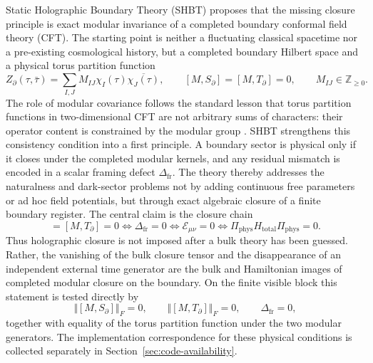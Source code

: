 \documentclass[11pt,letterpaper]{article}
\theoremstyle{plain}
\newcommand{\Deltafr}{\Delta_{\text{fr}}}
\newcommand{\Ebulk}{\mathcal E_{\mu\nu}}
\newcommand{\Zboundary}{Z_{\partial}}
\newcommand{\Htotal}{H_{\text{total}}}
\begin{document}
Static Holographic Boundary Theory (SHBT) proposes that the missing closure
principle is exact modular invariance of a completed boundary conformal field
theory (CFT).  The starting point is neither a fluctuating classical spacetime
nor a pre-existing cosmological history, but a completed boundary Hilbert space
and a physical torus partition function
\begin{equation}
 \Zboundary(\tau,\bar\tau)
 =
 \sum_{I,J}M_{IJ}\chi_I(\tau)\overline{\chi_J(\tau)},
 \qquad
 [M,S_{\partial}]=[M,T_{\partial}]=0,
 \qquad
 M_{IJ}\in\mathbb Z_{\ge0}.
\end{equation}
The role of modular covariance follows the standard lesson that torus partition
functions in two-dimensional CFT are not arbitrary sums of characters: their
operator content is constrained by the modular group
\cite{cardy1986,cappelli1987}.  SHBT strengthens this consistency condition
into a first principle.  A boundary sector is physical only if it closes under
the completed modular kernels, and any residual mismatch is encoded in a scalar
framing defect $\Deltafr$.  The theory thereby addresses the naturalness and
dark-sector problems not by adding continuous free parameters or ad hoc field
potentials, but through exact algebraic closure of a finite boundary register.  The central claim is the closure chain
\begin{equation}
 [M,S_{\partial}]=[M,T_{\partial}]=0
 \Longleftrightarrow
 \Deltafr=0
 \Longleftrightarrow
 \Ebulk=0
 \Longleftrightarrow
 \Pi_{\text{phys}}\Htotal\Pi_{\text{phys}}=0.
\end{equation}
Thus holographic closure is not imposed after a bulk theory has been guessed.
Rather, the vanishing of the bulk closure tensor and the disappearance of an
independent external time generator are the bulk and Hamiltonian images of
completed modular closure on the boundary.  On the finite visible block this
statement is tested directly by
\begin{equation}
 \Vert[M,S_{\partial}]\Vert_F=0,
 \qquad
 \Vert[M,T_{\partial}]\Vert_F=0,
 \qquad
 \Deltafr=0,
\end{equation}
together with equality of the torus partition function under the two modular
generators.  The implementation correspondence for these physical conditions
is collected separately in Section~\ref{sec:code-availability}.
\end{document}
